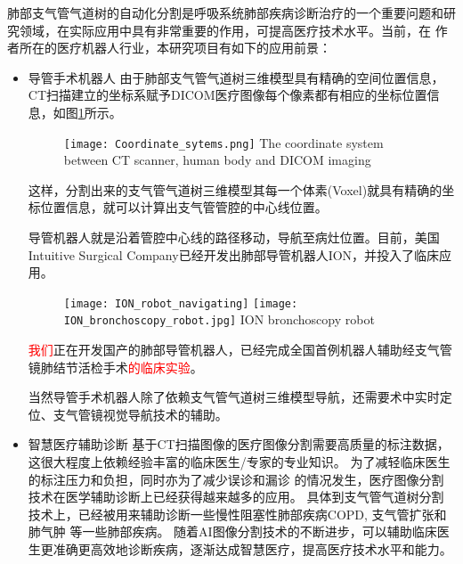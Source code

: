 肺部支气管气道树的自动化分割是呼吸系统肺部疾病诊断治疗的一个重要问题和研究领域，在实际应用中具有非常重要的作用，可提高医疗技术水平。当前，在
作者所在的医疗机器人行业，本研究项目有如下的应用前景：
\begin{itemize}
	\item {\heiti 导管手术机器人 }
	由于肺部支气管气道树三维模型具有精确的空间位置信息，CT扫描建立的坐标系赋予DICOM医疗图像每个像素都有相应的坐标位置信息，如图\ref{fig:coordinate}所示。
	\begin{figure}[!htp]
		\centering
		\texttt{[image: Coordinate\_sytems.png]}
			{The coordinate system between CT scanner, human body and DICOM imaging}
		\label{fig:coordinate}
	\end{figure}
	这样，分割出来的支气管气道树三维模型其每一个体素(Voxel)就具有精确的坐标位置信息，就可以计算出支气管管腔的中心线位置。
	
	导管机器人就是沿着管腔中心线的路径移动，导航至病灶位置。目前，美国Intuitive Surgical Company已经开发出肺部导管机器人ION，并投入了临床应用。
	\begin{figure}[!htp]
		\centering
		\texttt{[image: ION\_robot\_navigating]}
		\hspace{2mm}
		\texttt{[image: ION\_bronchoscopy\_robot.jpg]}
			{ION bronchoscopy robot}
		\label{fig:ION_robot}
	\end{figure}
	
	\textcolor{red}{我们}正在开发国产的肺部导管机器人，已经完成全国首例机器人辅助经支气管镜肺结节活检手术\textcolor{red}{的临床实验}。
	
	当然导管手术机器人除了依赖支气管气道树三维模型导航，还需要术中实时定位、支气管镜视觉导航技术的辅助。
	
	
	\item {\heiti 智慧医疗辅助诊断}
	基于CT扫描图像的医疗图像分割需要高质量的标注数据，这很大程度上依赖经验丰富的临床医生/专家的专业知识。 为了减轻临床医生的标注压力和负担，同时亦为了减少误诊和漏诊
	的情况发生，医疗图像分割技术在医学辅助诊断上已经获得越来越多的应用。 具体到支气管气道树分割技术上，已经被用来辅助诊断一些慢性阻塞性肺部疾病COPD, 支气管扩张和肺气肿
	等一些肺部疾病。 随着AI图像分割技术的不断进步，可以辅助临床医生更准确更高效地诊断疾病，逐渐达成智慧医疗，提高医疗技术水平和能力。
\end{itemize}



